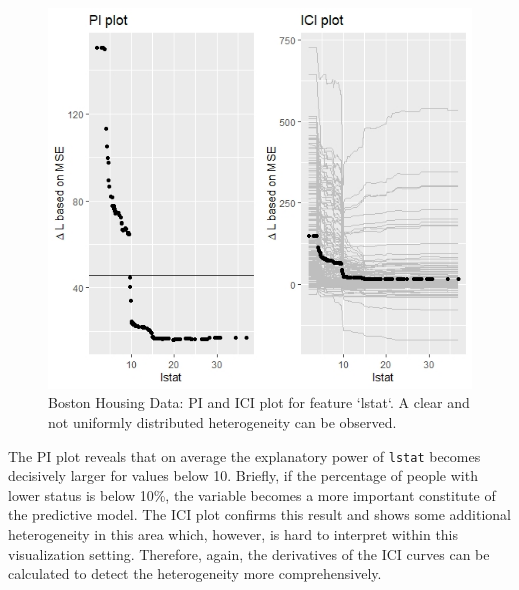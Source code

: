 \documentclass[]{krantz}
\begin{document}
\begin{figure}

{\centering \includegraphics[width=0.99\linewidth]{images/03-7-RD1} 

}

\caption{Boston Housing Data: PI and ICI plot for feature `lstat`. A clear and not uniformly distributed heterogeneity can be observed.}\label{fig:fig9}
\end{figure}

The PI plot reveals that on average the explanatory power of
\texttt{lstat} becomes decisively larger for values below 10. Briefly,
if the percentage of people with lower status is below 10\%, the
variable becomes a more important constitute of the predictive model.
The ICI plot confirms this result and shows some additional
heterogeneity in this area which, however, is hard to interpret within
this visualization setting. Therefore, again, the derivatives of the ICI
curves can be calculated to detect the heterogeneity more
comprehensively.
\end{document}
